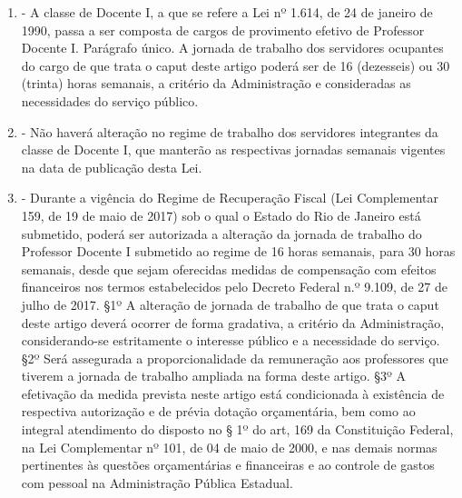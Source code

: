 \documentclass[10pt]{article}
\begin{document}
\begin{enumerate}[label=Art. \arabic*\textdegree]
\item - A classe de Docente I, a que se refere a Lei nº 1.614, de 24 de janeiro de 1990, passa a ser composta de cargos de provimento efetivo de Professor Docente I.
Parágrafo único.  A jornada de trabalho dos servidores ocupantes do cargo de que trata o caput deste artigo poderá ser de 16 (dezesseis) ou 30 (trinta) horas semanais, a critério da Administração e consideradas as necessidades do serviço público.

\item - Não haverá alteração no regime de trabalho dos servidores integrantes da classe de Docente I, que manterão as respectivas jornadas semanais vigentes na data de publicação desta Lei.

\item - Durante a vigência do Regime de Recuperação Fiscal (Lei Complementar 159, de 19 de maio de 2017) sob o qual o Estado do Rio de Janeiro está submetido, poderá ser autorizada a alteração da jornada de trabalho do Professor Docente I submetido ao regime de 16 horas semanais, para 30 horas semanais, desde que sejam oferecidas medidas de compensação com efeitos financeiros nos termos estabelecidos pelo Decreto Federal n.º 9.109, de 27 de julho de 2017.
§1º A alteração de jornada de trabalho de que trata o caput deste artigo deverá ocorrer de forma gradativa, a critério da Administração, considerando-se estritamente o interesse público e a necessidade do serviço.
§2º Será assegurada a proporcionalidade da remuneração aos professores que tiverem a jornada de trabalho ampliada na forma deste artigo. 
§3º A efetivação da medida prevista neste artigo está condicionada à existência de respectiva autorização e de prévia dotação orçamentária, bem como ao integral atendimento do disposto no § 1º do art, 169 da Constituição Federal, na Lei Complementar nº 101, de 04 de maio de 2000, e nas demais normas pertinentes às questões orçamentárias e financeiras e ao controle de gastos com pessoal na Administração Pública Estadual.


\end{enumerate}
\end{document}

